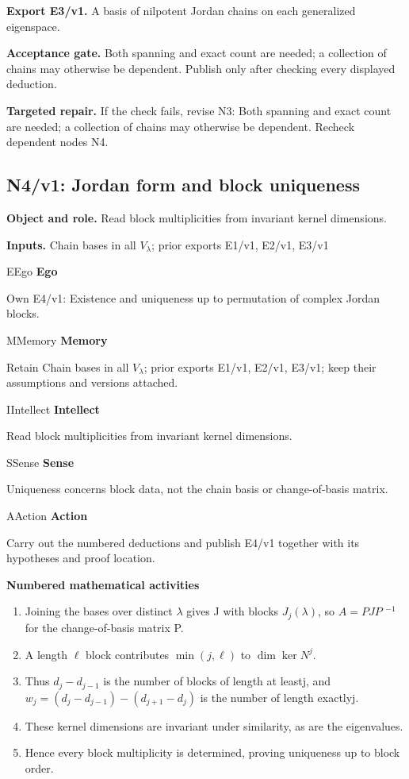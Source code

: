 \documentclass[preprint,12pt,aps,pra,showkeys,amsmath,amssymb,superscriptaddress,floatfix]{revtex4-2}
\theoremstyle{definition}
\theoremstyle{remark}
\newcommand{\mmfaculty}[3]{%
 \begin{mmfacultybox}{#1}{#2}
 {\sffamily\bfseries\color{MMBlue}#2}\par\smallskip #3
 \end{mmfacultybox}}
\newcommand{\field}[2]{\par\smallskip\noindent\textbf{#1.} #2\par}
\begin{document}
\field{Export E3/v1}{A basis of nilpotent Jordan chains on each generalized eigenspace.}

\field{Acceptance gate}{Both spanning and exact count are needed; a collection of chains may
otherwise be dependent. Publish only after checking every displayed
deduction.}

\field{Targeted repair}{If the check fails, revise N3: Both spanning and exact count are needed;
a collection of chains may otherwise be dependent. Recheck dependent
nodes N4.}

\clearpage

\subsection{N4/v1: Jordan form and block uniqueness}

\field{Object and role}{Read block multiplicities from invariant kernel dimensions.}

\field{Inputs}{Chain bases in all \(V_\lambda\); prior exports E1/v1, E2/v1, E3/v1}

\mmfaculty{E}{Ego}{Own E4/v1: Existence and uniqueness up to permutation of complex Jordan
blocks.}

\mmfaculty{M}{Memory}{Retain Chain bases in all \(V_\lambda\); prior exports E1/v1, E2/v1,
E3/v1; keep their assumptions and versions attached.}

\mmfaculty{I}{Intellect}{Read block multiplicities from invariant kernel dimensions.}

\mmfaculty{S}{Sense}{Uniqueness concerns block data, not the chain basis or change-of-basis
matrix.}

\mmfaculty{A}{Action}{Carry out the numbered deductions and publish E4/v1 together with its
hypotheses and proof location.}

\smallskip\noindent\textbf{Numbered mathematical activities}

\begin{enumerate}[label=N4.\arabic*,leftmargin=3.4em]

\item Joining the bases over distinct \(\lambda\) gives J with blocks
\(J_j(\lambda )\), so \(A=PJP\) \(^{-1}\) for the change-of-basis matrix
P.

\item A length \(\ell\) block contributes \(\operatorname{min} (j,\ell )\) to
\(\dim\ker N^j\).

\item Thus \(d_j-d_{j-1}\) is the number of blocks of length at leastj, and
\(w_j=(d_j-d_{j-1})-(d_{j+1}-d_j)\) is the number of length exactlyj.

\item These kernel dimensions are invariant under similarity, as are the
eigenvalues.

\item Hence every block multiplicity is determined, proving uniqueness up to
block order.

\end{enumerate}
\end{document}
